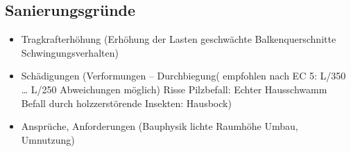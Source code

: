 \documentclass[fleqn,twoside,dvipsnames]{article}
\begin{document}
     \subsection{Sanierungsgründe}
                \begin{itemize}
                    \item Tragkrafterhöhung (Erhöhung der Lasten
                        geschwächte Balkenquerschnitte
                        Schwingungsverhalten)
                    \item Schädigungen (Verformungen – Durchbiegung(
                        empfohlen nach EC 5: L/350 … L/250
                        Abweichungen möglich)
                        Risse
                        Pilzbefall: Echter Hausschwamm
                        Befall durch holzzerstörende Insekten: Hausbock)
                    \item Ansprüche, Anforderungen (Bauphysik
                        lichte Raumhöhe
                        Umbau, Umnutzung)
                \end{itemize}
\end{document}
